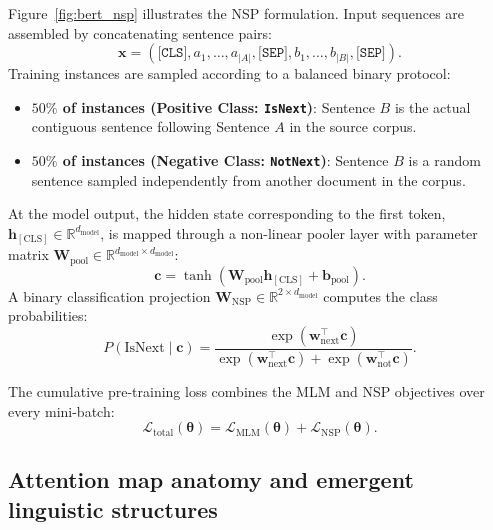 \documentclass[../../main.tex]{subfiles}
\begin{document}
Figure~\ref{fig:bert_nsp} illustrates the NSP formulation. Input sequences are assembled by concatenating sentence pairs:
\begin{equation}
\mathbf{x} = (\texttt{[CLS]}, a_1, \dots, a_{|A|}, \texttt{[SEP]}, b_1, \dots, b_{|B|}, \texttt{[SEP]}).
\end{equation}
Training instances are sampled according to a balanced binary protocol:
\begin{itemize}
    \item \textbf{$50\%$ of instances (Positive Class: \texttt{IsNext})}: Sentence $B$ is the actual contiguous sentence following Sentence $A$ in the source corpus.
    \item \textbf{$50\%$ of instances (Negative Class: \texttt{NotNext})}: Sentence $B$ is a random sentence sampled independently from another document in the corpus.
\end{itemize}

At the model output, the hidden state corresponding to the first token, $\mathbf{h}_{[\text{CLS}]} \in \mathbb{R}^{d_{\text{model}}}$, is mapped through a non-linear pooler layer with parameter matrix $\mathbf{W}_{\text{pool}} \in \mathbb{R}^{d_{\text{model}} \times d_{\text{model}}}$:
\begin{equation}
\mathbf{c} = \tanh(\mathbf{W}_{\text{pool}} \mathbf{h}_{[\text{CLS}]} + \mathbf{b}_{\text{pool}}).
\label{eq:bert_pooled_cls_representation}
\end{equation}
A binary classification projection $\mathbf{W}_{\text{NSP}} \in \mathbb{R}^{2 \times d_{\text{model}}}$ computes the class probabilities:
\begin{equation}
P(\text{IsNext} \mid \mathbf{c}) = \frac{\exp(\mathbf{w}_{\text{next}}^\top \mathbf{c})}{\exp(\mathbf{w}_{\text{next}}^\top \mathbf{c}) + \exp(\mathbf{w}_{\text{not}}^\top \mathbf{c})}.
\label{eq:bert_nsp_probability}
\end{equation}

The cumulative pre-training loss combines the MLM and NSP objectives over every mini-batch:
\begin{equation}
\mathcal{L}_{\text{total}}(\boldsymbol{\theta}) = \mathcal{L}_{\text{MLM}}(\boldsymbol{\theta}) + \mathcal{L}_{\text{NSP}}(\boldsymbol{\theta}).
\label{eq:bert_total_pretraining_objective}
\end{equation}


\subsection{Attention map anatomy and emergent linguistic structures}
\label{subsec:bert_attention_map_anatomy}
\end{document}
